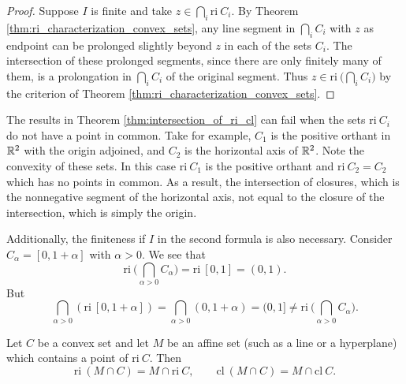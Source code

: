 \documentclass[11pt,a4paper]{article}
\begin{document}
\begin{proof}
    \noindent \converse Suppose $I$ is finite and take $z\in \bigcap_i \mathrm{ri}\ C_i$. By Theorem \ref{thm:ri_characterization_convex_sets}, any line segment in $\bigcap_i C_i$ with $z$ as endpoint can be prolonged slightly beyond $z$ in each of the sets $C_i$. The intersection of these prolonged segments, since there are only finitely many of them, is a prolongation in $\bigcap_i C_i$ of the original segment. Thus $z\in \mathrm{ri}\ \Big(\bigcap_i C_i\Big)$ by the criterion of Theorem \ref{thm:ri_characterization_convex_sets}.
\end{proof}

\begin{remark}
    The results in Theorem \ref{thm:intersection_of_ri_cl} can fail when the sets $\mathrm{ri}\ C_i$ do not have a point in common. Take for example, $C_1$ is the positive orthant in $\mathbb{R}^2$ with the origin adjoined, and $C_2$ is the horizontal axis of $\mathbb{R}^2$. Note the convexity of these sets. In this case $\mathrm{ri}\ C_1$ is the positive orthant and $\mathrm{ri}\ C_2 = C_2$ which has no points in common. As a result, the intersection of closures, which is the nonnegative segment of the horizontal axis, not equal to the closure of the intersection, which is simply the origin. 

    Additionally, the finiteness if $I$ in the second formula is also necessary. Consider $C_\alpha = [0,1+\alpha]$ with $\alpha>0$. We see that 
    \begin{equation*}
        \mathrm{ri}\ \Big(\bigcap_{\alpha>0} C_\alpha\Big) = \mathrm{ri}\ [0,1] = (0,1).   
    \end{equation*}
    But 
    \begin{equation*}
        \bigcap_{\alpha>0} (\mathrm{ri}\ [0,1+\alpha]) = \bigcap_{\alpha>0} (0,1+\alpha) = (0,1] \neq \mathrm{ri}\ \Big(\bigcap_{\alpha>0} C_\alpha\Big).
    \end{equation*}
\end{remark}

\begin{corollary}\label{cor:intersection_ri_cl}
    Let $C$ be a convex set and let $M$ be an affine set (such as a line or a hyperplane) which contains a point of $\mathrm{ri}\ C$. Then 
    \begin{equation*}
        \mathrm{ri}\ (M\cap C) = M \cap \mathrm{ri}\ C,\qquad \mathrm{cl}\ (M\cap C) = M \cap \mathrm{cl}\ C.
    \end{equation*}
\end{corollary}
\end{document}
